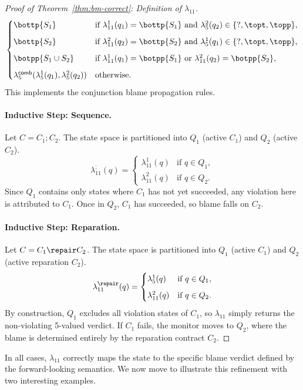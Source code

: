 \begin{proof}[Proof of Theorem~\ref{thm:bm-correct}: Definition of $\lambda_{11}$]
\[\begin{cases}
      \bottp{S_1} 
        & \text{if } \lambda_{11}^1(q_1)=\bottp{S_1} \text{ and } \lambda_5^2(q_2) \in \{\mathsf{?}, \topt, \topp\}, \\[6pt]
    
      \bottp{S_2} 
        & \text{if } \lambda_{11}^2(q_2)=\bottp{S_2} \text{ and } \lambda_5^1(q_1) \in \{\mathsf{?}, \topt, \topp\}, \\[6pt]
        
      \botpp{S_1 \cup S_2}
        & \text{if } \lambda_{11}^1(q_1)=\botpp{S_1} \text{ or } \lambda_{11}^2(q_2)=\botpp{S_2}, \\[6pt]
    
      \lambda_5^{\textsf{comb}}(\lambda_5^1(q_1), \lambda_5^2(q_2)) 
        & \text{otherwise}.
    \end{cases}
    \]
    This implements the conjunction blame propagation rules.
    
    \paragraph{Inductive Step: Sequence.}
    Let $C = C_1 ; C_2$. The state space is partitioned into $Q_1$ (active $C_1$) and $Q_2$ (active $C_2$).
    \[
    \lambda_{11}^{;}(q) = 
    \begin{cases}
      \lambda_{11}^1(q) 
        & \text{if } q \in Q_1, \\[6pt]
      \lambda_{11}^2(q) 
        & \text{if } q \in Q_2.
    \end{cases}
    \]
    Since $Q_1$ contains only states where $C_1$ has not yet succeeded, any violation here is attributed to $C_1$. Once in $Q_2$, $C_1$ has succeeded, so blame falls on $C_2$.
    
    \paragraph{Inductive Step: Reparation.}
    Let $C = C_1 \repair C_2$. The state space is partitioned into $Q_1$ (active $C_1$) and $Q_2$ (active reparation $C_2$).
    \[
    \lambda_{11}^{\repair}(q) = 
    \begin{cases}
      \lambda_{5}^1(q) 
        & \text{if } q \in Q_1, \\[6pt]
      \lambda_{11}^2(q) 
        & \text{if } q \in Q_2.
    \end{cases}
    \]
   By construction, $Q_1$ excludes all violation states of $C_1$, so $\lambda_{11}$ simply returns the non-violating 5-valued verdict. If $C_1$ fails, the monitor moves to $Q_2$, where the blame is determined entirely by the reparation contract $C_2$.
    \end{proof}
    In all cases, $\lambda_{11}$ correctly maps the state to the specific blame verdict defined by the forward-looking semantics. We now move to illustrate this refinement with two interesting examples.

